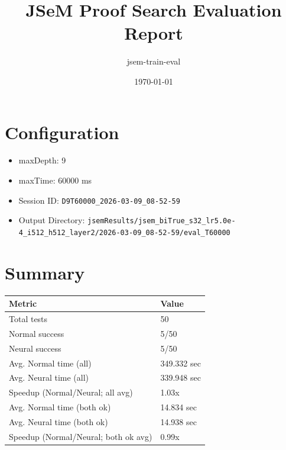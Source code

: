 \documentclass[a4paper,10pt]{article}
\title{JSeM Proof Search Evaluation Report}
\author{jsem-train-eval}
\date{\today}
\begin{document}
\maketitle

\section{Configuration}
\begin{itemize}
\item maxDepth: 9
\item maxTime: 60000 ms
\item Session ID: \texttt{D9T60000\_2026-03-09\_08-52-59}
\item Output Directory: \texttt{jsemResults/jsem\_biTrue\_s32\_lr5.0e-4\_i512\_h512\_layer2/2026-03-09\_08-52-59/eval\_T60000}
\end{itemize}

\section{Summary}
\begin{tabular}{ll}
\toprule
\textbf{Metric} & \textbf{Value} \\
\midrule
Total tests & 50 \\
Normal success & 5/50 \\
Neural success & 5/50 \\
\midrule
Avg. Normal time (all) & 349.332 sec \\
Avg. Neural time (all) & 339.948 sec \\
Speedup (Normal/Neural; all avg) & 1.03x \\
Avg. Normal time (both ok) & 14.834 sec \\
Avg. Neural time (both ok) & 14.938 sec \\
Speedup (Normal/Neural; both ok avg) & 0.99x \\
\bottomrule
\end{tabular}
\end{document}
